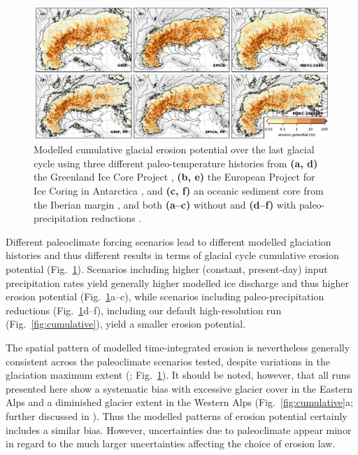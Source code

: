 \documentclass[esurf, manuscript]{copernicus}
\begin{document}
    \begin{figure}
      \centerline{\includegraphics{alpero_sensitivity}}
      \caption{%
        Modelled cumulative glacial erosion potential over the last glacial
        cycle using three different paleo-temperature histories from
        \textbf{(a, d)} the Greenland Ice Core Project
        \citep[GRIP;][]{Dansgaard.etal.1993}, \textbf{(b, e)} the European
        Project for Ice Coring in Antarctica \citep[our default,
        EPICA;][]{Jouzel.etal.2007}, and \textbf{(c, f)} an oceanic sediment
        core from the Iberian margin \citep[MD01-2444;][]{Martrat.etal.2007},
        and both \textbf{(a--c)} without and \textbf{(d--f)} with
        paleo-precipitation reductions \citep[cf.][]{Seguinot.etal.2018}.}
      \label{fig:sensitivity}
    \end{figure}

    Different paleoclimate forcing scenarios lead to different modelled
    glaciation histories \citep[cf.][]{Seguinot.etal.2018} and thus different
    results in terms of glacial cycle cumulative erosion
    potential (Fig.~\ref{fig:sensitivity}). Scenarios including higher
    (constant, present-day) input precipitation rates yield generally higher
    modelled ice discharge and thus higher
    erosion potential (Fig.~\ref{fig:sensitivity}a--c), while scenarios
    including paleo-precipitation reductions (Fig.~\ref{fig:sensitivity}d--f),
    including our default high-resolution run
    (Fig.~\ref{fig:cumulative}), yield a smaller erosion potential.

    The spatial pattern of modelled time-integrated erosion is nevertheless
    generally consistent across the paleoclimate scenarios tested,
    despite variations in the glaciation maximum extent
    (\citealp[Fig.~3 in][]{Seguinot.etal.2018}; Fig.~\ref{fig:sensitivity}).
    It should be noted, however, that all runs presented here show a systematic
    bias with excessive glacier cover in the Eastern Alps and a diminished
    glacier extent in the Western Alps (Fig.~\ref{fig:cumulative}a; further
    discussed in \citealp{Seguinot.etal.2018}). Thus the modelled patterns of
    erosion potential certainly includes a similar bias. However, uncertainties
    due to paleoclimate appear minor in regard to the much larger uncertainties
    affecting the choice of erosion law.
\end{document}
